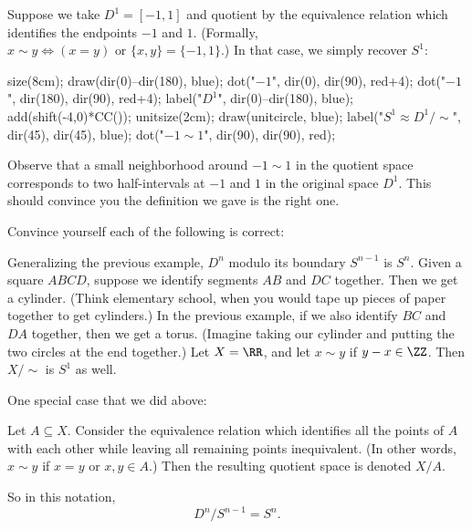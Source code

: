 \documentclass[11pt]{scrreprt}
\begin{document}
\begin{example}
	Suppose we take $D^1 = [-1, 1]$
	and quotient by the equivalence relation which identifies
	the endpoints $-1$ and $1$.
	(Formally, $x \sim y \iff (x=y) \text{ or } \{x,y\} = \{-1,1\}$.)
	In that case, we simply recover $S^1$:
	\begin{center}
		\begin{asy}
			size(8cm);
			draw(dir(0)--dir(180), blue);
			dot("$-1$", dir(0), dir(90), red+4);
			dot("$-1$", dir(180), dir(90), red+4);
			label("$D^1$", dir(0)--dir(180), blue);
			add(shift(-4,0)*CC());
			unitsize(2cm);
			draw(unitcircle, blue);
			label("$S^1 \approx D^1 / {\sim}$", dir(45), dir(45), blue);
			dot("$-1 \sim 1$", dir(90), dir(90), red);
		\end{asy}
	\end{center}
	Observe that a small neighborhood around $-1 \sim 1$ in the quotient space
	corresponds to two half-intervals at $-1$ and $1$ in the original space $D^1$.
	This should convince you the definition we gave is the right one.
\end{example}

\begin{example}
	Convince yourself each of the following is correct:
	\begin{itemize}
		\ii Generalizing the previous example, $D^n$ modulo its boundary $S^{n-1}$ is $S^n$.
		\ii Given a square $ABCD$, suppose we identify segments $AB$ and $DC$ together.
		Then we get a cylinder. (Think elementary school, when you would tape
		up pieces of paper together to get cylinders.)
		\ii In the previous example, if we also identify $BC$ and $DA$ together,
		then we get a torus. (Imagine taking our cylinder and putting the two
		circles at the end together.)
		\ii Let $X = \RR$, and let $x \sim y$ if $y -x \in \ZZ$.
		Then $X / {\sim}$ is $S^1$ as well.
	\end{itemize}
\end{example}

One special case that we did above:
\begin{definition}
	Let $A \subseteq X$.
	Consider the equivalence relation which identifies
	all the points of $A$ with each other
	while leaving all remaining points inequivalent.
	(In other words, $x \sim y$ if $x=y$ or $x,y \in A$.)
	Then the resulting quotient space is denoted $X/A$.
\end{definition}

So in this notation, \[ D^n / S^{n-1} = S^n. \]
\end{document}
